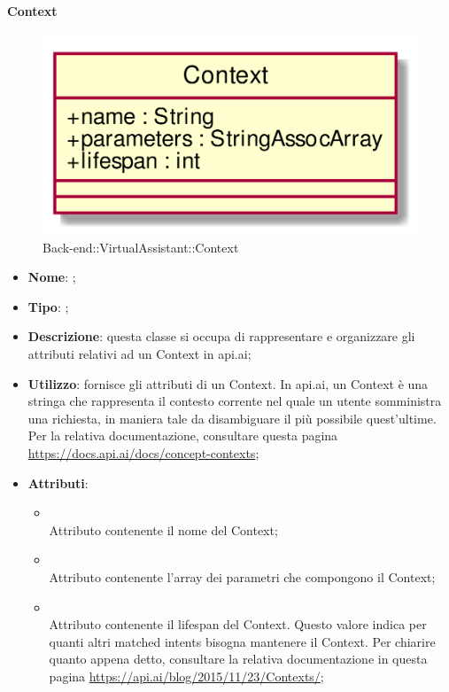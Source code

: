 \hypertarget{Context_label}{\paragraph{Context}}
\begin{figure}[h]
	\centering
	\includegraphics[width=\textwidth,height=\textheight,keepaspectratio]{images/ClassContext.png}
	\caption{Back-end::VirtualAssistant::Context}
\end{figure}
\begin{itemize}
	\item \textbf{Nome}: ;
	\item \textbf{Tipo}: ;
	\item \textbf{Descrizione}: questa classe si occupa di rappresentare e organizzare gli attributi relativi ad un Context in api.ai;
	\item \textbf{Utilizzo}: fornisce gli attributi di un Context.
In api.ai, un Context è una stringa che rappresenta il contesto corrente nel quale un utente somministra una richiesta, in maniera tale da disambiguare il più possibile quest'ultime. \\
Per la relativa documentazione, consultare questa pagina \url{https://docs.api.ai/docs/concept-contexts};
	\item \textbf{Attributi}:
	\begin{itemize}
		\item[]  \\
		Attributo contenente il nome del Context;
		\item[]  \\
		Attributo contenente l'array dei parametri che compongono il Context;
		\item[]  \\
		Attributo contenente il lifespan del Context.
Questo valore indica per quanti altri matched intents bisogna mantenere il Context.
Per chiarire quanto appena detto, consultare la relativa documentazione in questa pagina \url{https://api.ai/blog/2015/11/23/Contexts/};
	\end{itemize}
\end{itemize}
\FloatBarrier

